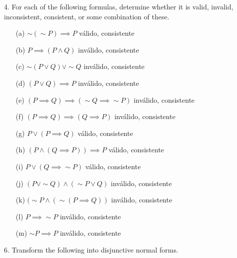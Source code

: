 4. For each of the following formulas, determine whether it is valid, invalid, inconsistent, consistent, or some combination of these.
\begin{enumerate}
 \item[(a)] $ \sim(\sim P) \implies P $ \newline
válido, consistente
 \item[(b)] $ P \implies (P \wedge Q) $ \newline
inválido, consistente
 \item[(c)] $ \sim(P \vee Q) \vee \sim Q $ \newline
inválido, consistente
 \item[(d)] $ (P \vee Q) \implies P $ \newline
inválido, consistente
 \item[(e)] $ (P \implies Q) \implies ( \sim Q \implies \sim P) $ \newline
inválido, consistente
 \item[(f)] $ (P \implies Q) \implies ( Q \implies P) $ \newline
inválido, consistente
 \item[(g)] $ P \vee (P \implies Q) $ \newline
válido, consistente
 \item[(h)] $ (P \wedge (Q \implies P)) \implies P $ \newline
válido, consistente
 \item[(i)] $ P \vee (Q \implies \sim P) $ \newline
válido, consistente
 \item[(j)] $ (P \vee \sim Q) \wedge (\sim P \vee Q) $ \newline
inválido, consistente
 \item[(k)] $ (\sim P \wedge (\sim (P \implies Q)) $ \newline
inválido, consistente
 \item[(l)] $ P \implies \sim P $ \newline
inválido, consistente
 \item[(m)] $ \sim P \implies P $ \newline
inválido, consistente
\end{enumerate}

6. Transform the following into disjunctive normal forms.

